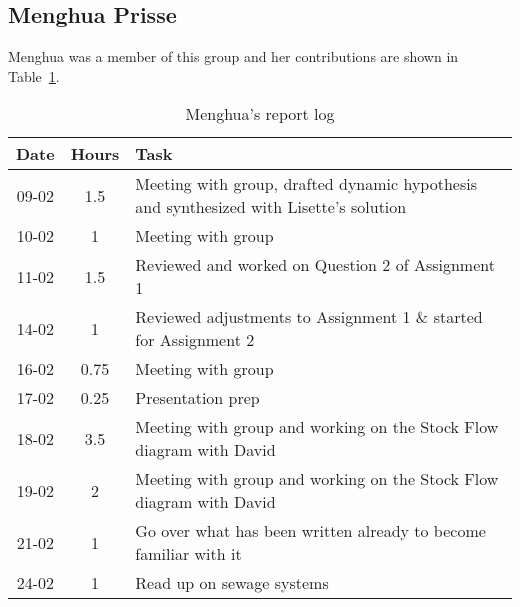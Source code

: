 
\subsection{Menghua Prisse}
Menghua was a member of this group and her contributions are shown in Table~\ref{tab:menghua_log}. 
\begin{longtable}[c]{c|c|m{35em}}
\caption{Menghua's report log}
\label{tab:menghua_log}\\
\textbf{Date}& \textbf{Hours} & \textbf{Task} \\
\hline
\endfirsthead
%
\endhead
%
09-02  & 1.5 & Meeting with group, drafted dynamic hypothesis and synthesized with Lisette's solution\\
10-02 & 1 & Meeting with group \\ 
11-02 & 1.5 & Reviewed and worked on Question 2 of Assignment 1 \\
14-02 & 1 & Reviewed adjustments to Assignment 1 \& started for Assignment 2 \\ 
16-02 & 0.75 & Meeting with group \\ 
17-02 & 0.25 & Presentation prep \\
18-02 & 3.5 & Meeting with group and working on the Stock Flow diagram with David  \\
19-02 & 2 & Meeting with group and working on the Stock Flow diagram with David \\ 
21-02 & 1 & Go over what has been written already to become familiar with it \\
24-02 & 1 & Read up on sewage systems \\ 

\end{longtable}

